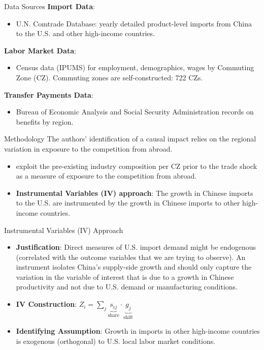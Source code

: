 \documentclass{beamer}
\begin{document}
\begin{frame}{Data Sources}
\textbf{Import Data}:
    \begin{itemize}
        \item U.N. Comtrade Database: yearly detailed product-level imports from China to the U.S. and other high-income countries.
        \end{itemize}    
    \textbf{Labor Market Data}: 
        \begin{itemize}
            \item Census data (IPUMS) for employment, demographics, wages by Commuting Zone (CZ). Commuting zones are self-constructed: 722 CZs.
        \end{itemize}
    \textbf{Transfer Payments Data}: 
    \begin{itemize}
        \item Bureau of Economic Analysis and Social Security Administration records on benefits by region.
    \end{itemize}
\end{frame}

\begin{frame}{Methodology}
The authors' identification of a causal impact relies on the regional variation in exposure to the competition from abroad.
    \begin{itemize}
        \item \textcite{china_syndrome} exploit the pre-existing industry composition per CZ prior to the trade shock as a measure of exposure to the competition from abroad.
        \item \textbf{Instrumental Variables (IV) approach}: The growth in Chinese imports to the U.S. are instrumented by the growth in Chinese imports to other high-income countries. 
    \end{itemize}
\end{frame}


\begin{frame}{Instrumental Variables (IV) Approach}
    \begin{itemize}
        \item \textbf{Justification}: Direct measures of U.S. import demand might be endogenous (correlated with the outcome variables that we are trying to observe). An instrument isolates China’s supply-side growth and should only capture the variation in the variable of interest that is due to a growth in Chinese productivity and not due to U.S. demand or manufacturing conditions.
        \item \textbf{IV Construction}: $Z_i = \sum_j \underbrace{s_{ij}}_{\text{share}} \cdot \underbrace{g_j}_{\text{shift}}$
        \item \textbf{Identifying Assumption}: Growth in imports in other high-income countries is exogenous (orthogonal) to U.S. local labor market conditions.
    \end{itemize}
\end{frame}
\end{document}

